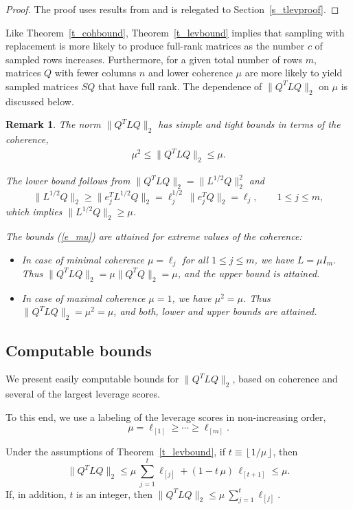 \documentclass{siamltex}
\newtheorem{remark}[theorem]{Remark}
\begin{document}
\begin{proof} The proof uses results from  \cite{BalzRN11,Recht11}
and is relegated to Section~\ref{s_tlevproof}.
\end{proof}

Like Theorem~\ref{t_cohbound}, Theorem~\ref{t_levbound} implies that
sampling with replacement is more likely to produce full-rank matrices
as the number $c$ of sampled rows increases. Furthermore, for a given
total number of rows $m$, matrices $Q$ with fewer columns $n$ and
lower coherence $\mu$ are more likely to yield sampled matrices
$SQ$ that have full rank. The 
dependence of $\|Q^TLQ\|_2$ on $\mu$ is discussed below.

\begin{remark} \label{r_lq}
The norm $\|Q^TLQ\|_2$ has simple and tight bounds in terms of the coherence,
\begin{eqnarray}\label{e_mu}
\mu^2\leq \|Q^TLQ\|_2\leq  \mu.
\end{eqnarray}

The lower bound follows from $\|Q^TLQ\|_2=\|L^{1/2}Q\|_2^2$ and 
$$\|L^{1/2}Q\|_2\geq \|e_j^TL^{1/2}Q\|_2=\ell_j^{1/2}\>\|e_j^TQ\|_2=\ell_j,
\qquad 1\leq j\leq m,$$
which implies  $\|L^{1/2}Q\|_2\geq\mu$.
\smallskip

The bounds (\ref{e_mu}) are attained for extreme values of the coherence:
\begin{itemize}
\item In case of minimal coherence $\mu=\ell_j$ for all $1\leq j\leq m$, 
we have
$L=\mu I_m$. Thus $\|Q^TLQ\|_2=\mu\|Q^TQ\|_2=\mu$, and the upper bound is 
attained.
\item In case of maximal coherence $\mu=1$, we have $\mu^2=\mu$.
Thus $\|Q^TLQ\|_2=\mu^2=\mu$, and both, lower and upper bounds
are attained.
\end{itemize}
\end{remark}

\subsection{Computable bounds}\label{s_clevbound}
We present easily computable bounds for $\|Q^TLQ\|_2$, based 
on coherence and several of the largest leverage scores.

To this end, we use a labeling of the leverage scores in non-increasing order,
$$\mu=\ell_{[1]}\geq \cdots\geq \ell_{[m]}.$$ 

\begin{corollary}\label{c_1}
Under the assumptions of Theorem~\ref{t_levbound}, if
$t\equiv\left\lfloor 1/\mu\right\rfloor$, then
$$\|Q^TLQ\|_2\leq \mu\>\sum_{j=1}^t{\ell_{[j]}}+(1-t\,\mu)\,\ell_{[t+1]}
\leq \mu.$$
If, in addition, $t$ is an integer, then
$\|Q^TLQ\|_2\leq \mu\>\sum_{j=1}^t{\ell_{[j]}}$.
\end{corollary}
\end{document}
